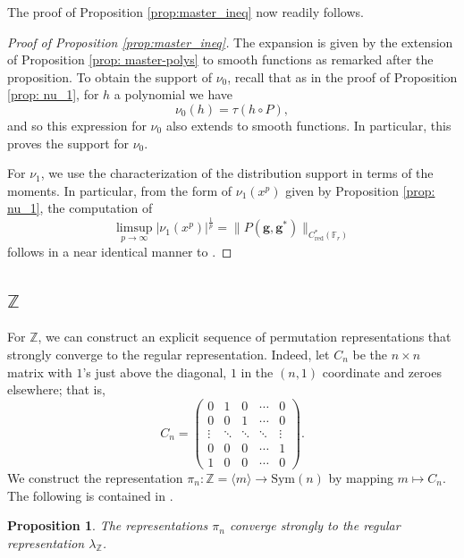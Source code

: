 \documentclass[12pt]{article}
\newtheorem{proposition}[theorem]{Proposition}
\newcommand{\Z}{\mathbb{Z}}
\newcommand{\F}{\mathbb{F}}
\newcommand{\1}{\mathds{1}}
\newcommand{\g}{\mathbf{g}}
\begin{document}
The proof of Proposition \ref{prop:master_ineq} now readily follows.

\begin{proof}[Proof of Proposition \ref{prop:master_ineq}]
The expansion is given by the extension of Proposition \ref{prop: master-polys} to smooth functions as remarked after the proposition. To obtain the support of $\nu_0$, recall that as in the proof of Proposition \ref{prop: nu_1}, for $h$ a polynomial we have
    $$\nu_0(h) = \tau(h\circ P),$$
and so this expression for $\nu_0$ also extends to smooth functions. In particular, this proves the support for $\nu_0$.

For $\nu_1$, we use the characterization of the distribution support in terms of the moments. In particular, from the form of $\nu_1(x^p)$ given by Proposition \ref{prop: nu_1}, the computation of
    $$\limsup_{p\to\infty}|\nu_1(x^p)|^{\frac{1}{p}}=\|P(\g,\g^*)\|_{C^*_{\mathrm{red}}(\F_r)}$$
follows in a near identical manner to \cite[Proof of Lemma 3.10]{vanhandel2026strongconvergencephenomenon}.
\end{proof}

\subsection{$\Z$}
\label{subsec:Z}

For $\Z$, we can construct an explicit sequence of permutation representations that strongly converge to the regular representation. Indeed, let $C_n$ be the $n\times n$ matrix with $1$'s just above the diagonal, $1$ in the $(n,1)$ coordinate and zeroes elsewhere; that is,
    $$C_n = \begin{pmatrix}
        0 & 1 & 0 & \cdots & 0 \\
        0 & 0 & 1 & \cdots & 0 \\
        \vdots & \ddots & \ddots & \ddots & \vdots \\
        0 & 0 & 0 & \cdots & 1\\
        1 & 0 & 0 & \cdots & 0        
    \end{pmatrix}.$$
We construct the representation $\pi_n:\Z=\langle m\rangle \to \mathrm{Sym}(n)$ by mapping $m\mapsto C_n$. The following is contained in \cite[Proof of Lemma 5.1]{Lo.Ma2025}.

\begin{proposition}
The representations $\pi_n$ converge strongly to the regular representation $\lambda_{\Z}$.
\end{proposition}
\end{document}
